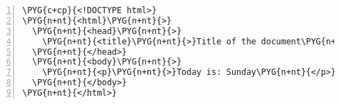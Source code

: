 \begin{Verbatim}[commandchars=\\\{\},numbers=left,stepnumber=1,codes={\catcode`\$=3\catcode`\^=7\catcode`\_=8}]
\PYG{c+cp}{<!DOCTYPE html>}
\PYG{n+nt}{<html}\PYG{n+nt}{>}
  \PYG{n+nt}{<head}\PYG{n+nt}{>}
    \PYG{n+nt}{<title}\PYG{n+nt}{>}Title of the document\PYG{n+nt}{</title>}
  \PYG{n+nt}{</head>}
  \PYG{n+nt}{<body}\PYG{n+nt}{>}
    \PYG{n+nt}{<p}\PYG{n+nt}{>}Today is: Sunday\PYG{n+nt}{</p>}
  \PYG{n+nt}{</body>}
\PYG{n+nt}{</html>}
\end{Verbatim}
